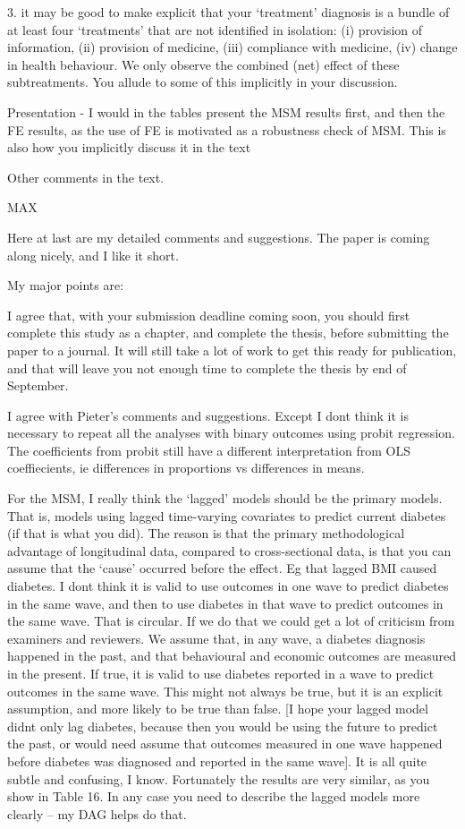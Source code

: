 3. it may be good to make explicit that your ‘treatment’ diagnosis is a bundle of at least four ‘treatments’ that are not identified in isolation:  (i) provision of information, (ii) provision of medicine, (iii) compliance with medicine, (iv) change in health behaviour. We only observe the combined (net) effect of these subtreatments. You allude to some of this implicitly in your discussion.
 
Presentation
- I would in the tables present the MSM results first, and then the FE results, as the use of FE is motivated as a robustness check of MSM. This is also how you implicitly discuss it in the text
 
Other comments in the text.






MAX

Here at last are my detailed comments and suggestions. The paper is coming along nicely, and I like it short.
 
My major points are:
 
I agree that, with your submission deadline coming soon, you should first complete this study as a chapter, and complete the thesis, before submitting the paper to a journal. It will still take a lot of work to get this ready for publication, and that will leave you not enough time to complete the thesis by end of September.
 
I agree with Pieter’s comments and suggestions. Except I dont think it is necessary to repeat all the analyses with binary outcomes using probit regression. The coefficients from probit still have a different interpretation from OLS coeffiecients, ie differences in proportions vs differences in means.
 
For the MSM, I really think the ‘lagged’ models should be the primary models. That is, models using lagged time-varying covariates to predict current diabetes (if that is what you did). The reason is that the primary methodological advantage of longitudinal data, compared to cross-sectional data, is that you can assume that the ‘cause’ occurred before the effect. Eg that lagged BMI caused diabetes. I dont think it is valid to use outcomes in one wave to predict diabetes in the same wave, and then to use diabetes in that wave to predict outcomes in the same wave. That is circular. If we do that we could get a lot of criticism from examiners and reviewers. We assume that, in any wave, a diabetes diagnosis happened in the past, and that behavioural and economic outcomes are measured in the present. If true, it is valid to use diabetes reported in a wave to predict outcomes in the same wave. This might not always be true, but it is an explicit assumption, and more likely to be true than false. [I hope your lagged model didnt only lag diabetes, because then you would be using the future to predict the past, or would need assume that outcomes measured in one wave happened before diabetes was diagnosed and reported in the same wave]. It is all quite subtle and confusing, I know.  Fortunately the results are very similar, as you show in Table 16. In any case you need to describe the lagged models more clearly – my DAG helps do that.
 
